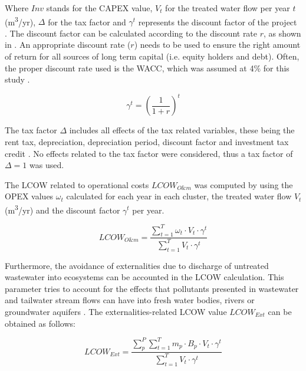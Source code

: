 Where $Inv$ stands for the CAPEX value, $V_{t}$ for the treated water flow per year $t$ (m\textsuperscript{3}/yr), $\Delta$ for the tax factor and $\gamma^{t}$ represents the discount factor of the project . The discount factor can be calculated according to the discount rate $r$, as shown in . An appropriate discount rate ($r$) needs to be used to ensure the right amount of return for all sources of long term capital (i.e. equity holders and debt). Often, the proper discount rate used is the WACC, which was assumed at 4\% for this study \cite{prospectscostcompetitive2013}. 

\begin{equation}\label{eq:gamma}
\gamma^{t} = \left(\frac{1}{1+r}\right)^{t}
\end{equation}

The tax factor $\Delta$ includes all effects of the tax related variables, these being the rent tax, depreciation, depreciation period, discount factor and investment tax credit \cite{prospectscostcompetitive2013}. No effects related to the tax factor were considered, thus a tax factor of $\Delta=1$ was used.

The LCOW related to operational costs $LCOW_{O\&m}$  was computed by using the OPEX values $\omega_{t}$ calculated for each year in each cluster, the treated water flow $V_{t}$ (m\textsuperscript{3}/yr) and the discount factor $\gamma^t$ per year.

\begin{equation}\label{eq:lcow_om}
LCOW_{O\&m} = \frac{\sum_{t=1}^{T} \omega_{t}\cdot V_{t}\cdot\gamma^{t}}{\sum_{t=1}^{T} V_{t}\cdot\gamma^{t}}
\end{equation}

Furthermore, the avoidance of externalities due to discharge of untreated wastewater into ecosystems can be accounted in the LCOW calculation. This parameter tries to account for the effects that pollutants presented in wastewater and tailwater stream flows can have into fresh water bodies, rivers or groundwater aquifers \cite{Assessmentwastewatertreatment2012}. The externalities-related LCOW value $LCOW_{Ext}$  can be obtained as follows:

\begin{equation}\label{eq:lcow_ext}
LCOW_{Ext} = \frac{\sum_{p}^{P}\sum_{t=1}^{T} m_{p}\cdot B_p\cdot V_{t}\cdot\gamma^{t}}{\sum_{t=1}^{T} V_{t}\cdot\gamma^{t}}
\end{equation}

